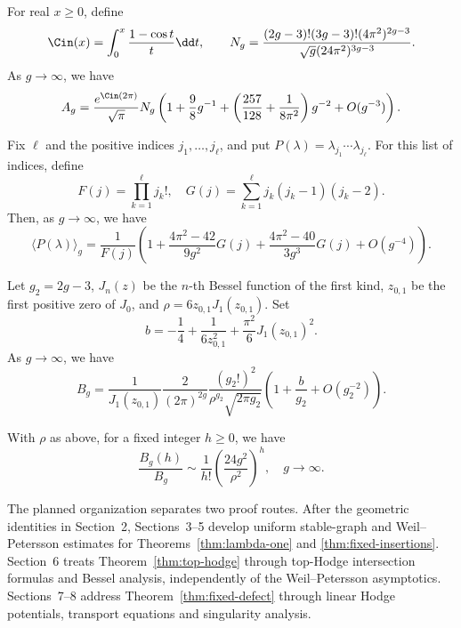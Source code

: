 \begin{thm}
\label{thm:lambda-one}
For real $x\geq0$, define
\[\Cin(x)=\int_0^x \frac{1-\cos t}{t}\dd t, \qquad
N_g=\frac{(2g-3)!(3g-3)!(4\pi^2)^{2g-3}}{\sqrt{g}(24\pi^2)^{3g-3}}.\]
As $g\to \infty$, we have
\begin{equation}
A_g=\frac{e^{\Cin(2\pi)}}{\sqrt{\pi}}N_g
\left(1+\frac{9}{8}g^{-1}+\left(\frac{257}{128}+\frac{1}{8\pi^2}\right)g^{-2}+O(g^{-3})\right).
\label{eq:111}
\end{equation}
\end{thm}

\begin{thm}
\label{thm:fixed-insertions}
Fix $\ell$ and the positive indices $j_1,\ldots,j_\ell$, and put
$P(\lambda)=\lambda_{j_1}\cdots\lambda_{j_\ell}$.  For this list of
indices, define
\[F(j)=\prod_{k=1}^\ell j_k!, \quad G(j)=\sum_{k=1}^\ell j_k(j_k-1)(j_k-2).\]
Then, as $g\to\infty$, we have
\begin{equation}
\langle P(\lambda) \rangle_g=\frac{1}{F(j)}\left(1+\frac{4\pi^2-42}{9g^2}G(j)+
\frac{4\pi^2-40}{3g^3}G(j)+O(g^{-4})\right).
\label{eq:P111}
\end{equation}
\end{thm}

\begin{thm}
\label{thm:top-hodge}
Let $g_2=2g-3$, $J_n(z)$ be the $n$-th Bessel function of the first kind, $z_{0,1}$ be the first
positive zero of $J_0$, and $\rho=6z_{0,1}J_1(z_{0,1})$.
Set
\[b=-\frac{1}{4}+\frac{1}{6z_{0,1}^2}+\frac{\pi^2}{6}J_1(z_{0,1})^2.\]
As $g\to\infty$, we have
\begin{equation}
B_g=\frac{1}{J_1(z_{0,1})}\frac{2}{(2\pi)^{2g}}\frac{(g_2!)^2}{\rho^{g_2}\sqrt{2\pi g_2}}\left(
1+\frac{b}{g_2}+O(g_2^{-2})\right).
\label{eq:g111}
\end{equation}
\end{thm}

\begin{thm}
\label{thm:fixed-defect}
With $\rho$ as above, for a fixed integer $h\geq0$, we have
\begin{equation}
\frac{B_g(h)}{B_g}\sim \frac{1}{h!}\left(\frac{24g^2}{\rho^2}\right)^h,\quad g\to\infty.
\label{eq:gh11}
\end{equation}
\end{thm}

The planned organization separates two proof routes.  After the geometric
identities in Section~2, Sections~3--5 develop uniform stable-graph and
Weil--Petersson estimates for Theorems~\ref{thm:lambda-one} and
\ref{thm:fixed-insertions}.  Section~6 treats
Theorem~\ref{thm:top-hodge} through top-Hodge intersection formulas
and Bessel analysis, independently of the Weil--Petersson asymptotics.
Sections~7--8 address Theorem~\ref{thm:fixed-defect} through linear
Hodge potentials, transport equations and singularity analysis.
